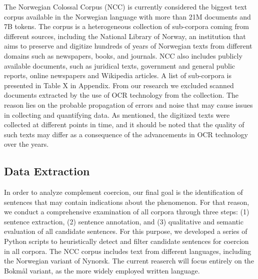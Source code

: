 \documentclass{article}
\begin{document}
The Norwegian Colossal Corpus (NCC) \parencite{kummervold_norwegian_2022} is currently considered the biggest text corpus available in the Norwegian language with more than 21M documents and 7B tokens. The corpus is a heterogeneous collection of sub-corpora coming from different sources, including the National Library of Norway, an institution that aims to preserve and digitize hundreds of years of Norwegian texts from different domains such as newspapers, books, and journals. NCC also includes publicly available documents, such as juridical texts, government and general public reports, online newspapers and Wikipedia articles. A list of sub-corpora is presented in Table X in Appendix. From our research we excluded scanned documents extracted by the use of OCR technology from the collection. The reason lies on the probable propagation of errors and noise that may cause issues in collecting and quantifying data. As \textcite{kummervold_norwegian_2022} mentioned, the digitized texts were collected at different points in time, and it should be noted that the quality of such texts may differ as a consequence of the advancements in OCR technology over the years.

\subsection{Data Extraction}
In order to analyze complement coercion, our final goal is the identification of sentences that may contain indications about the phenomenon. For that reason, we conduct a comprehensive examination of all corpora through three steps: (1) sentence extraction, (2) sentence annotation, and (3) qualitative and semantic evaluation of all candidate sentences. For this purpose, we developed a series of Python scripts to heuristically detect and filter candidate sentences for coercion in all corpora.
The NCC corpus includes text from different languages, including the Norwegian variant of Nynorsk. The current reaserch will focus entirely on the Bokmål variant, as the more widely employed written language. 
\end{document}
